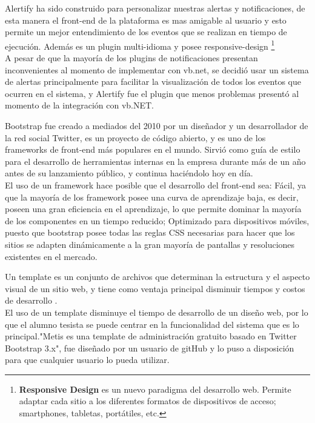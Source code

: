 Alertify ha sido construido para personalizar nuestras alertas y notificaciones, de esta manera el front-end de la plataforma es mas amigable al usuario y esto permite un mejor entendimiento de los eventos que se realizan en tiempo de ejecución. Además es un plugin multi-idioma y posee responsive-design \footnote{ \textbf{ Responsive Design} es un nuevo paradigma del desarrollo web. Permite adaptar cada sitio a los diferentes formatos de dispositivos de acceso; smartphones, tabletas, portátiles, etc.}
\\

A pesar de que la mayoría de los plugins de notificaciones presentan inconvenientes al momento de implementar con vb.net, se decidió usar un sistema de alertas principalmente para facilitar la visualización de todos los eventos que ocurren en el sistema, y Alertify fue el plugin que menos problemas presentó al momento de la integración con vb.NET.



Bootstrap fue creado a mediados del 2010 por un diseñador y un desarrollador de la red social Twitter, es un proyecto de código abierto, y es uno de los frameworks de front-end más populares en el mundo. Sirvió como guía de estilo para el desarrollo de herramientas internas en la empresa durante más de un año antes de su lanzamiento público, y continua haciéndolo hoy en día\cite{boo15}.
\\

El uso de un framework hace posible que el desarrollo del front-end sea: Fácil, ya que la mayoría de los framework posee una curva de aprendizaje baja, es decir, poseen una gran eficiencia en el  aprendizaje, lo que permite dominar la mayoría de los componentes en un tiempo reducido; Optimizado para dispositivos móviles, puesto que bootstrap posee todas las reglas CSS necesarias para hacer que los sitios se  adapten dinámicamente a la gran mayoría de pantallas y resoluciones existentes en el mercado.



Un template es un conjunto de archivos que determinan la estructura y el aspecto visual de un sitio web, y tiene como ventaja principal disminuir tiempos y costos de desarrollo \cite{gli15}. 
\\

El uso de un template disminuye el tiempo de desarrollo de un diseño web, por lo que el alumno tesista se puede centrar en la funcionalidad del sistema que es lo principal."Metis es una  template de administración gratuito basado en Twitter Bootstrap 3.x"\cite{git15}, fue diseñado por un usuario de gitHub y lo puso a disposición para que cualquier usuario lo pueda utilizar.

